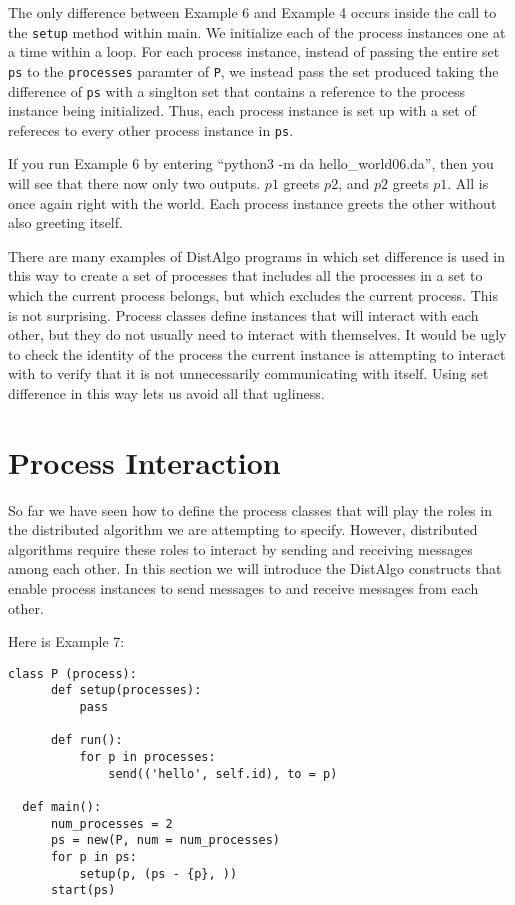 \documentclass[11pt]{article}
\begin{document}
The only difference between Example 6 and Example 4 occurs inside the call to
the \texttt{setup} method within main. We initialize each of the process
instances one at a time within a loop. For each process instance, instead of
passing the entire set \texttt{ps} to the \texttt{processes} paramter of
\texttt{P}, we instead pass the set produced taking the difference of
\texttt{ps} with a singlton set that contains a reference to the process
instance being initialized. Thus, each process instance is set up with a set of
refereces to every other process instance in \texttt{ps}.

If you run Example 6 by entering ``python3 -m da hello\_world06.da'', then you
will see that there now only two outputs. $p1$ greets $p2$, and $p2$ greets
$p1$. All is once again right with the world. Each process instance greets the
other without also greeting itself.

There are many examples of DistAlgo programs in which set difference is used in
this way to create a set of processes that includes all the processes in a set
to which the current process belongs, but which excludes the current process.
This is not surprising. Process classes define instances that will interact
with each other, but they do not usually need to interact with themselves. It
would be ugly to check the identity of the process the current instance is
attempting to interact with to verify that it is not unnecessarily
communicating with itself. Using set difference in this way lets us avoid all
that ugliness.

\section{Process Interaction}

So far we have seen how to define the process classes that will play the roles
in the distributed algorithm we are attempting to specify. However, distributed
algorithms require these roles to interact by sending and receiving messages
among each other. In this section we will introduce the DistAlgo constructs
that enable process instances to send messages to and receive messages from
each other.

Here is Example 7:
\begin{lstlisting}[caption={hello\_world07.da - Send}, label={lst:hw07}]
  class P (process):
      def setup(processes):
          pass

      def run():
          for p in processes:
              send(('hello', self.id), to = p)

  def main():
      num_processes = 2
      ps = new(P, num = num_processes)
      for p in ps:
          setup(p, (ps - {p}, ))
      start(ps)
\end{lstlisting}
\end{document}
